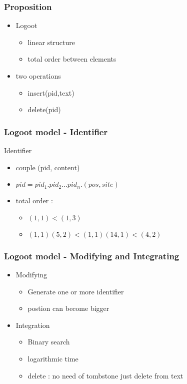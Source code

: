\documentclass[14pt]{beamer}
\begin{document}
	\begin{frame}
		\frametitle{Proposition}
		\begin{itemize}
			\item Logoot
			\begin{itemize}
				\item linear structure
				\item total order between elements
			\end{itemize}
			\item two operations
			\begin{itemize}
				\item insert(pid,text)
				\item delete(pid)
			\end{itemize}
		\end{itemize}
	\end{frame}

	\begin{frame}
		\frametitle{Logoot model - Identifier}
		Identifier
		\begin{itemize}
			\item couple (pid, content)
			\item $pid=pid_1.pid_2...pid_n.(pos, site)$
			\item total order :
				\begin{itemize}
					\item $(1,1) < (1,3)$
					\item $(1,1)(5,2) < (1,1)(14,1) < (4,2) $
				\end{itemize}
		\end{itemize}		
	\end{frame}

	\begin{frame}
		\frametitle{Logoot model - Modifying and Integrating}
		\begin{itemize}
			\item Modifying
				\begin{itemize}
					\item Generate one or more identifier
					\item postion can become bigger
				\end{itemize}
			\item Integration
				\begin{itemize}
					\item Binary search
					\item logarithmic time
					\item delete : no need of tombstone just delete from text
				\end{itemize}		
		\end{itemize}
	\end{frame}
\end{document}
